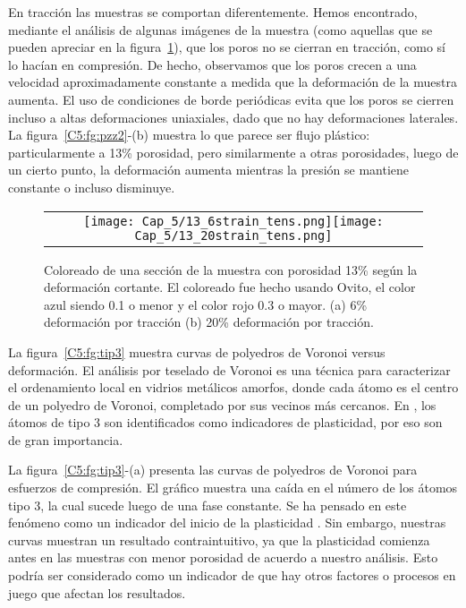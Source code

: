 En tracción las muestras se comportan diferentemente. Hemos encontrado, mediante el análisis de algunas imágenes de la muestra (como aquellas
que se pueden apreciar en la figura~\ref{C5:fg:ss_tens}), que los poros no se cierran en tracción, como sí lo hacían en compresión. De hecho,
observamos que los poros crecen a una velocidad aproximadamente constante a medida que la deformación de la muestra aumenta. El uso de
condiciones de borde periódicas evita que los poros se cierren incluso a altas deformaciones uniaxiales, dado que no hay deformaciones laterales.
La figura~\ref{C5:fg:pzz2}-(b) muestra lo que parece ser flujo plástico: particularmente a 13\% porosidad, pero similarmente a otras porosidades,
luego de un cierto punto, la deformación aumenta mientras la presión se mantiene constante o incluso disminuye.

\begin{figure}[h!]
  \centering
  \begin{tabular}{c}
    \texttt{[image: Cap\_5/13\_6strain\_tens.png]}\texttt{[image: Cap\_5/13\_20strain\_tens.png]} \\
  \end{tabular}
  \caption{Coloreado de una sección de la muestra con porosidad 13\% según la deformación cortante. El coloreado fue hecho 
  usando Ovito, el color azul siendo 0.1 o menor y el color rojo 0.3 o mayor. (a) 6\% deformación por tracción
  (b) 20\% deformación por tracción.}
  \label{C5:fg:ss_tens}
\end{figure}

La figura~\ref{C5:fg:tip3} muestra curvas de polyedros de Voronoi versus deformación. El análisis por teselado de Voronoi es una técnica para
caracterizar el ordenamiento local en vidrios metálicos amorfos, donde cada átomo es el centro de un polyedro de Voronoi,
completado por sus vecinos más cercanos. En \cite{arman10}, los átomos de tipo 3 son identificados como indicadores de plasticidad, por eso
son de gran importancia.

La figura~\ref{C5:fg:tip3}-(a) presenta las curvas de polyedros de Voronoi para esfuerzos de compresión. El gráfico muestra una caída en el número
de los átomos tipo 3, la cual sucede luego de una fase constante. Se ha pensado en este fenómeno como un indicador del inicio de la plasticidad
\citep{arman10}. Sin embargo, nuestras curvas muestran un resultado contraintuitivo, ya que la plasticidad comienza antes en las muestras con menor
porosidad de acuerdo a nuestro análisis. Esto podría ser considerado como un indicador de que hay otros factores o procesos en juego que afectan
los resultados.

